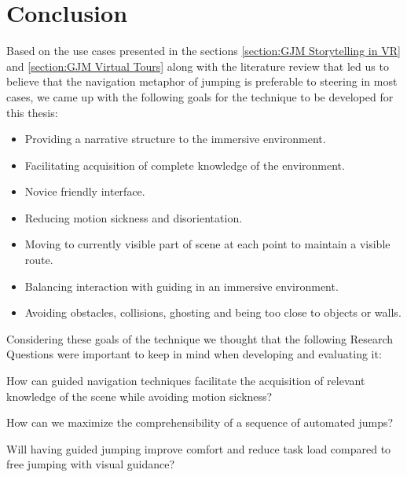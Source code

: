 
\section{Conclusion}
\label{section:GJM Conclusion}
Based on the use cases presented in the sections \ref{section:GJM Storytelling in VR} and \ref{section:GJM Virtual Tours} along with the literature review that led us to believe that the navigation metaphor of jumping is preferable to steering in most cases, we came up with the following goals for the technique to be developed for this thesis:
\begin{itemize}
	\item Providing a narrative structure to the immersive environment.
	\item Facilitating acquisition of complete knowledge of the environment.
	\item Novice friendly interface.
	\item Reducing motion sickness and disorientation.
	\item Moving to currently visible part of scene at each point to maintain a visible route.
	\item Balancing interaction with guiding in an immersive environment.
	\item Avoiding obstacles, collisions, ghosting and being too close to objects or walls.
\end{itemize}
Considering these goals of the technique we thought that the following Research Questions were important to keep in mind when developing and evaluating it: 
\begin{researchq}
	\label{rq:rq1}
	How can guided navigation techniques facilitate the acquisition of relevant knowledge of the scene while avoiding motion sickness?
\end{researchq}
\begin{researchq}
	\label{rq:rq2}
	How can we maximize the comprehensibility of a sequence of automated jumps?
\end{researchq}
\begin{researchq}
	\label{rq:rq3}
	Will having guided jumping improve comfort and reduce task load compared to free jumping with visual guidance?
\end{researchq}


